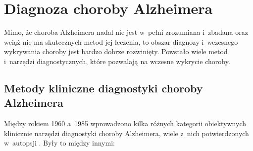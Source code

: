 \section{Diagnoza choroby Alzheimera}

Mimo, że choroba Alzheimera nadal nie jest w~pełni zrozumiana i~zbadana oraz wciąż nie ma skutecznych metod jej leczenia, to obszar diagnozy i~wczesnego wykrywania choroby jest bardzo dobrze rozwinięty.
Powstało wiele metod i~narzędzi diagnostycznych, które pozwalają na wczesne wykrycie choroby.

\subsection{Metody kliniczne diagnostyki choroby Alzheimera}

Między rokiem 1960 a~1985 wprowadzono kilka różnych kategorii obiektywnych klinicznie narzędzi diagnostyki choroby Alzheimera, wiele z~nich potwierdzonych w~autopsji \cite{khachaturian2006diagnosis}.
Były to między innymi:

